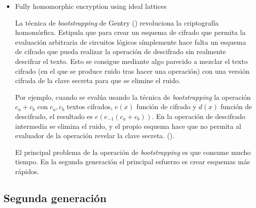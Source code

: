 \begin{itemize}

    \item Fully homomorphic encryption using ideal lattices
    
    La técnica de \textit{bootstrapping} de Gentry (\cite{gentry_fully_2009}) revoluciona la criptografía homomórfica. Estipula que para crear un esquema de cifrado que permita la evaluación arbitraria de circuitos lógicos símplemente hace falta un esquema de cifrado que pueda realizar la operación de descifrado sin realmente descifrar el texto. Esto se consigue mediante algo parecido a mezclar el texto cifrado (en el que se produce ruido tras hacer una operación) con una versión cifrada de la clave secreta para que se elimine el ruido. 
    
    Por ejemplo, cuando se evalúa usando la técnica de \textit{bootstrapping} la operación $ c_a + c_b$ con $c_a, c_b$ textos cifrados, $e(x)$ función de cifrado y  $d(x)$ función de descifrado, el resultado es $e( e_{-1}(c_a + c_b) )$. En la operación de descifrado intermedia se elimina el ruido, y el propio esquema hace que no permita al evaluador de la operación revelar la clave secreta. (\cite{noauthor_homomorphic_nodate-3}).
    
    El principal problema de la operación de \textit{bootstrapping} es que consume mucho tiempo. En la segunda generación el principal esfuerzo es crear esquemas más rápidos.
        
\end{itemize}

\subsection{Segunda generación}

